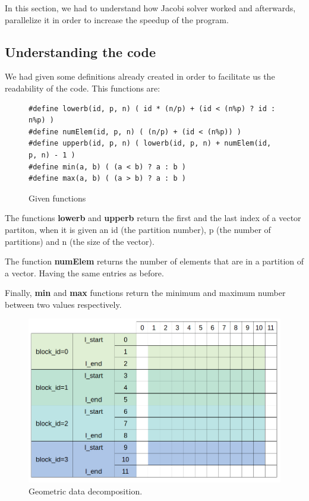 \documentclass[12pt, a4paper]{article}
\begin{document}
In this section, we had to understand how Jacobi solver worked and afterwards, parallelize it in order to increase the speedup of the program.

\subsection{Understanding the code}

We had given some definitions already created in order to facilitate us the readability of the code. This functions are:

\begin{figure}[H]
\begin{lstlisting}
#define lowerb(id, p, n) ( id * (n/p) + (id < (n%p) ? id : n%p) )
#define numElem(id, p, n) ( (n/p) + (id < (n%p)) )
#define upperb(id, p, n) ( lowerb(id, p, n) + numElem(id, p, n) - 1 )
#define min(a, b) ( (a < b) ? a : b )
#define max(a, b) ( (a > b) ? a : b )
\end{lstlisting}
\caption{Given functions}
\end{figure}

The functions \textbf{lowerb} and \textbf{upperb} return the first and the last index of a vector partiton, when it is given an id (the partition number), p (the number of partitions) and n (the size of the vector).

The function \textbf{numElem} returns the number of elements that are in a partition of a vector. Having the same entries as before.

Finally, \textbf{min} and \textbf{max} functions return the minimum and maximum number between two values respectively.

\begin{figure}[H]
	\centering
	\includegraphics[scale=0.70]{./images/data_decomposition_2.png}
	\caption{Geometric data decomposition.}
	\label{fig:geometricdatadecomposition}
\end{figure}
\end{document}
